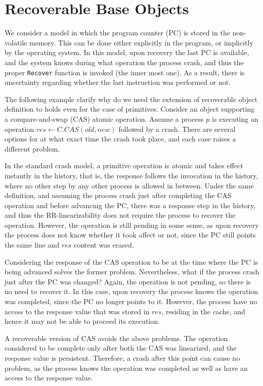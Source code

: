 
\section{Recoverable Base Objects}
\label{section: Recoverable Base Objects}

We consider a model in which the program counter (PC) is stored in the non-volatile memory. This can be done either explicitly in the program, or implicitly by the operating system. In this model, upon recovery the last PC is available, and the system knows during what operation the process crash, and thus the proper \texttt{Recover} function is invoked (the inner most one). As a result, there is uncertainty regarding whether the last instruction was performed or not.

The following example clarify why do we need the extension of recoverable object definition to holds even for the case of primitives.
Consider an object supporting a compare-and-swap (CAS) atomic operation. Assume a process $p$ is executing an operation $res \leftarrow C.CAS(old,new)$ followed by a crash. There are several options for at what exact time the crash took place, and each case raises a different problem.

In the standard crash model, a primitive operation is atomic and takes effect instantly in the history, that is, the response follows the invocation in the history, where no other step by any other process is allowed in between. Under the same definition, and assuming the process crash just after completing the CAS operation and before advancing the PC, there was a response step in the history, and thus the RR-linearizability does not require the process to recover the operation. However, the operation is still pending in some sense, as upon recovery the process does not know whether it took affect or not, since the PC still points the same line and $res$ content was erased.

Considering the response of the CAS operation to be at the time where the PC is being advanced solves the former problem. Nevertheless, what if the process crash just after the PC was changed? Again, the operation is not pending, so there is no need to recover it. In this case, upon recovery the process knows the operation was completed, since the PC no longer points to it. However, the process have no access to the response value that was stored in $res$, residing in the cache, and hence it may not be able to proceed its execution.

A recoverable version of CAS avoids the above problems. The operation considered to be complete only after both the CAS was linearized, and the response value is persistent. Therefore, a crash after this point can cause no problem, as the process knows the operation was completed as well as have an access to the response value.

